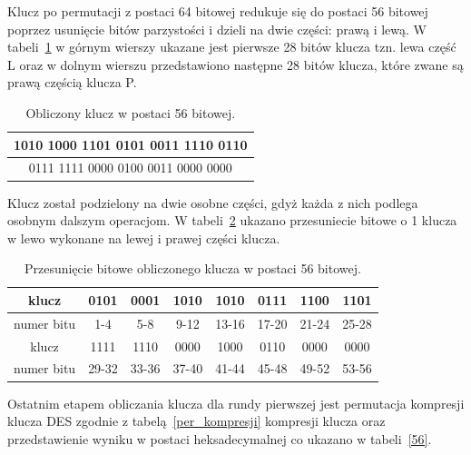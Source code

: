 \documentclass[12p]{article}
\begin{document}
Klucz po permutacji z postaci 64 bitowej redukuje się do postaci 56 bitowej poprzez usunięcie bitów parzystości i dzieli na dwie części: prawą i lewą. W tabeli~\ref{LP} w górnym wierszy ukazane jest pierwsze 28 bitów klucza tzn. lewa część L oraz w dolnym wierszu przedstawiono następne 28 bitów klucza, które zwane są prawą częścią klucza P.

\begin{table}[H]
\centering
\begin{tabular}{|c|}
\hline
1010 1000 1101 0101 0011 1110 0110\\
\hline
0111 1111 0000 0100 0011 0000 0000\\
\hline
\end{tabular}
\caption{Obliczony klucz w postaci 56 bitowej.}\label{LP}
\end{table}

Klucz został podzielony na dwie osobne części, gdyż każda z nich podlega osobnym dalszym operacjom. W tabeli~\ref{shift} ukazano przesuniecie bitowe o 1 klucza w lewo wykonane na lewej i prawej części klucza.

\begin{table}[H]
\centering
\begin{tabular}{|c|c|c|c|c|c|c|c|}
\hline
klucz&0101 &0001 &1010& 1010& 0111& 1100 &1101\\
\hline
numer bitu&1-4 & 5-8 & 9-12&13-16&17-20&21-24&25-28\\
\hline
klucz&1111 &1110 &0000& 1000& 0110& 0000 &0000\\
\hline
numer bitu&29-32&33-36&37-40&41-44&45-48&49-52&53-56\\
\hline
\end{tabular}
\caption{Przesunięcie bitowe obliczonego klucza w postaci 56 bitowej.}\label{shift}
\end{table}

Ostatnim etapem obliczania klucza dla rundy pierwszej jest permutacja kompresji klucza DES zgodnie z tabelą~\ref{per_kompresji} kompresji klucza oraz przedstawienie wyniku w postaci heksadecymalnej co ukazano w tabeli~\ref{56}.
\end{document}
